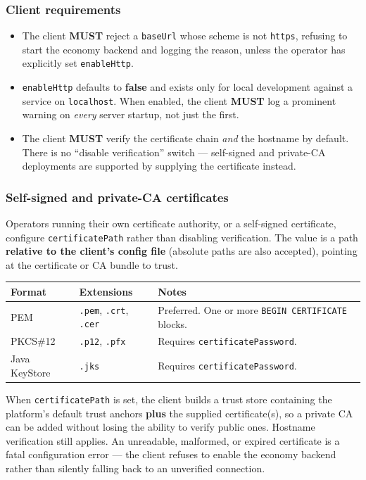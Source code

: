 \documentclass[11pt,a4paper]{article}
\newcommand{\code}[1]{\texttt{\small #1}}
\newcommand{\req}{\textbf{MUST}}
\begin{document}
\subsubsection*{Client requirements}
\begin{itemize}
\item The client \req{} reject a \code{baseUrl} whose scheme is not \code{https}, refusing to start
      the economy backend and logging the reason, unless the operator has explicitly set
      \code{enableHttp}.
\item \code{enableHttp} defaults to \textbf{false} and exists only for local development against a
      service on \code{localhost}. When enabled, the client \req{} log a prominent warning on
      \emph{every} server startup, not just the first.
\item The client \req{} verify the certificate chain \emph{and} the hostname by default. There is
      no ``disable verification'' switch --- self-signed and private-CA deployments are supported
      by supplying the certificate instead.
\end{itemize}

\subsubsection*{Self-signed and private-CA certificates}

Operators running their own certificate authority, or a self-signed certificate, configure
\code{certificatePath} rather than disabling verification. The value is a path \textbf{relative to
the client's config file} (absolute paths are also accepted), pointing at the certificate or CA
bundle to trust.

\begin{tabularx}{\linewidth}{L{3.0cm} L{4.0cm} X}
\toprule
\textbf{Format} & \textbf{Extensions} & \textbf{Notes}\\
\midrule
PEM      & \code{.pem}, \code{.crt}, \code{.cer} & Preferred. One or more \code{BEGIN CERTIFICATE} blocks.\\
PKCS\#12 & \code{.p12}, \code{.pfx}              & Requires \code{certificatePassword}.\\
Java KeyStore & \code{.jks}                      & Requires \code{certificatePassword}.\\
\bottomrule
\end{tabularx}

When \code{certificatePath} is set, the client builds a trust store containing the platform's
default trust anchors \textbf{plus} the supplied certificate(s), so a private CA can be added
without losing the ability to verify public ones. Hostname verification still applies. An
unreadable, malformed, or expired certificate is a fatal configuration error --- the client refuses
to enable the economy backend rather than silently falling back to an unverified connection.
\end{document}
